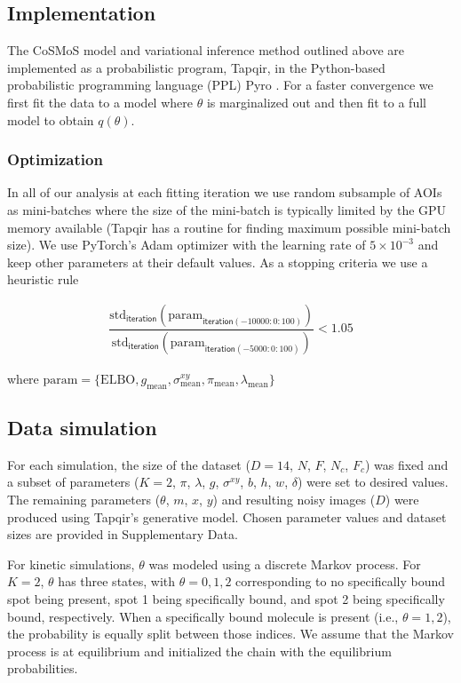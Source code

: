 \subsection*{Implementation}

The CoSMoS model and variational inference method outlined above are implemented as a probabilistic program, Tapqir, in the Python-based probabilistic programming language (PPL) Pyro \cite{Bingham2019-qy,Obermeyer2019-xt}. For a faster convergence we first fit the data to a model where $\theta$ is marginalized out and then fit to a full model to obtain $q(\theta)$.

\subsubsection*{Optimization}

In all of our analysis at each fitting iteration we use random subsample of AOIs as mini-batches where the size of the mini-batch is typically limited by the GPU memory available (Tapqir has a routine for finding maximum possible mini-batch size). We use PyTorch's Adam optimizer with the learning rate of $5\times 10^{-3}$ and keep other parameters at their default values. As a stopping criteria we use a heuristic rule

\begin{gather*}
    \dfrac{\mathrm{std}_\mathsf{iteration}(\mathrm{param}_{\mathsf{iteration}(-10000:0:100)})}{\mathrm{std}_\mathsf{iteration}(\mathrm{param}_{\mathsf{iteration}(-5000:0:100)})} < 1.05
\end{gather*}

\noindent where $\mathrm{param} = \{ \mathrm{ELBO}, g_\mathrm{mean}, \sigma^{xy}_\mathrm{mean}, \pi_\mathrm{mean}, \lambda_\mathrm{mean} \}$

\subsection*{Data simulation}

For each simulation, the size of the dataset ($D=14$, $N$, $F$, $N_c$, $F_c$) was fixed and a subset of parameters ($K=2$, $\pi$, $\lambda$, $g$, $\sigma^{xy}$, $b$, $h$, $w$, $\delta$) were set to desired values.  The remaining parameters ($\theta$, $m$, $x$, $y$) and resulting noisy images ($D$) were produced using Tapqir's generative model. Chosen parameter values and dataset sizes are provided in Supplementary Data.

For kinetic simulations, $\theta$ was modeled using a discrete Markov process. For $K=2$, $\theta$ has three states, with $\theta = 0, 1, 2$ corresponding to no specifically bound spot being present, spot 1 being specifically bound, and spot 2 being specifically bound, respectively. When a specifically bound molecule is present (i.e., $\theta = 1, 2$), the probability is equally split between those indices. We assume that the Markov process is at equilibrium and initialized the chain with the equilibrium probabilities.

